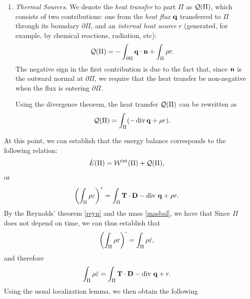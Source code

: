 \begin{enumerate}
	\item \textit{Thermal Sources}. We denote the \textit{heat transfer} to part \( \Pi \) as \( \mathcal{Q}(\Pi) \), which consists of two contributions: one from the \textit{heat flux} \( \mathbf{q} \) transferred to \( \Pi \) through its boundary \( \partial\Pi \), and an \textit{internal heat source} \( r \) (generated, for example, by chemical reactions, radiation, etc):
	\begin{equation}
		\mathcal{Q}(\Pi) = -\int_{\partial \Pi} \mathbf{q}\cdot \mathbf{n} + \int_{\Pi}\rho r.
	\end{equation}
	The negative sign in the first contribution is due to the fact that, since \( \mathbf{n} \) is the outward normal at \( \partial\Pi \), we require that the heat transfer be non-negative when the flux is entering \( \partial\Pi \).
	
	
	Using the divergence theorem, the heat transfer \( \mathcal{Q} (\Pi) \) can be rewritten as
	\begin{equation}
		\mathcal{Q}(\Pi)= \int_{\Pi}(-\operatorname{div} \mathbf{q} +\rho r).
	\end{equation}
	
\end{enumerate}


At this point, we can establish that the energy balance corresponds to the following relation:
\begin{equation}
	\dot{E}(\Pi)=\mathcal{W}^{\rm int}(\Pi)+\mathcal{Q} (\Pi),
\end{equation}
or
\begin{equation}
	\left(  \int_{\Pi}\rho \varepsilon\right)^{\mathop{\vcenter{\hbox{\Large$\cdot$}}}}= \int_{\Pi} \Tb \cdot \Db - \dive \, \mathbf{q} + \rho  r.
\end{equation}
By the Reynolds' theorem \eqref{reyn} and the  mass \eqref{masbal}, we have that
Since \( \Pi \) does not depend on time, we can thus establish that 
\begin{equation}
	\left( \int_{\Pi}\rho\varepsilon \right)^{\operatorname{{\boldsymbol{\cdot}}}}=\int_{\Pi}\rho\dot\varepsilon,
\end{equation}
and therefore 
\begin{equation}
	\int_{\Pi}\rho \dot{\varepsilon}= \int_{\Pi}  \mathbf{T} \cdot \mathbf{D} - \operatorname{div} \, \mathbf{q} + r.
\end{equation}
Using the usual localization lemma, we then obtain the following

